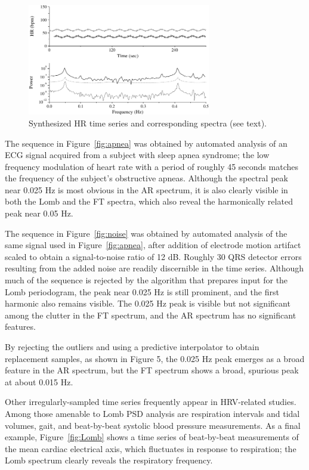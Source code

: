 \documentclass[twocolumn]{cinc}
\begin{document}
\begin{figure}
    \centerline{\includegraphics [width=8cm] {figures/fig2}}
    \caption{\label{fig:spectra} Synthesized HR time series and corresponding
      spectra (see text).}
\end{figure}

The sequence in Figure~\ref{fig:apnea} was obtained by automated analysis
of an ECG signal acquired from a subject with sleep apnea syndrome; the low
frequency modulation of heart rate with a period of roughly 45 seconds
matches the frequency of the subject's obstructive apneas.  Although the
spectral peak near 0.025 Hz is most obvious in the AR spectrum, it is also
clearly visible in both the Lomb and the FT spectra, which also reveal the
harmonically related peak near 0.05 Hz.

The sequence in Figure~\ref{fig:noise} was obtained by automated analysis
of the same signal used in Figure~\ref{fig:apnea}, after addition of
electrode motion artifact scaled to obtain a signal-to-noise ratio of 12
dB.  Roughly 30 QRS detector errors resulting from the added noise are
readily discernible in the time series.  Although much of the sequence is
rejected by the algorithm that prepares input for the Lomb periodogram, the
peak near 0.025 Hz is still prominent, and the first harmonic also remains
visible.  The 0.025 Hz peak is visible but not significant among the
clutter in the FT spectrum, and the AR spectrum has no significant
features.

By rejecting the outliers and using a
predictive interpolator to obtain replacement samples, as shown in
Figure 5, the 0.025 Hz peak emerges as a broad feature in the AR
spectrum, but the FT spectrum shows a broad, spurious peak at about
0.015 Hz.

Other irregularly-sampled time series frequently appear in HRV-related
studies.  Among those amenable to Lomb PSD analysis are respiration
intervals and tidal volumes, gait, and beat-by-beat systolic blood
pressure measurements.  As a final example, Figure~\ref{fig:Lomb} shows a time
series of beat-by-beat measurements of the mean cardiac electrical
axis, which fluctuates in response to respiration\cite{GM-85};  the
Lomb spectrum clearly reveals the respiratory frequency.
\end{document}
